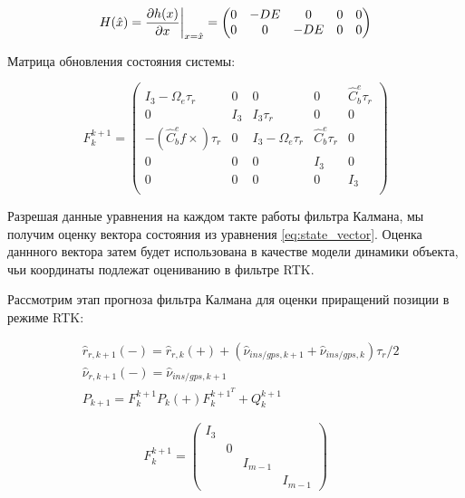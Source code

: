 \begin{equation}
	\label{eq:ins_20}
	H(\hat{x}) = \frac{\partial h(x)}{\partial x}\bigg{|}_{x=\hat{x}} = 
	\begin{pmatrix}
		0 & -DE & 0 & 0 & 0 \\ 
		0 & 0 & -DE & 0 & 0
	\end{pmatrix}
\end{equation}

Матрица обновления состояния системы: 

	\begin{equation}
		\label{eq:ins_21}
		F_k^{k+1} = 
		\begin{pmatrix}
			I_3 - \Omega_e \tau_r & 0 & 0 & 0 & \hat{C}_b^e \tau_r\\
			0 & I_3 & I_3 \tau_r & 0 & 0 \\
			-(\hat{C}_b^e f \times) \tau_r & 0 & I_3 - \Omega_e \tau_r & \hat{C}_b^e \tau_r & 0\\
			0 & 0 & 0 & I_3 & 0 \\
			0 & 0 & 0 & 0 & I_3 \\
		\end{pmatrix}
	\end{equation}

Разрешая данные уравнения на каждом такте работы фильтра Калмана, мы получим оценку вектора состояния из уравнения \ref{eq:state_vector}. Оценка даннного вектора затем будет использована в качестве модели динамики объекта, чьи координаты подлежат оцениванию в фильтре RTK. 


Рассмотрим этап прогноза фильтра Калмана для оценки приращений позиции в режиме RTK:  

\begin{equation}
	\label{eq:rk_gnss}
	\begin{split}
		& { \hat{r}_{r,k+1}(-) = \hat{r}_{r,k}(+) + (\hat{\nu}_{ins/gps,k+1} + \hat{\nu}_{ins/gps,k})\tau_r/2 } \\
		& { \hat{\nu}_{r,k+1}(-) = \hat{\nu}_{ins/gps,k+1} }\\
		& {P}_{k+1} = {F}_k^{k+1} {P}_k(+) {F}_k^{k+1^T} + {Q}_k^{k+1}
	\end{split}
\end{equation}

\begin{equation*}
	\label{eq:Fk_gnss}
	{F}_k^{k+1} = 
	\begin{pmatrix}
		{I}_3 & & & \\
		& 0 & & \\
		& & {I}_{m-1} & \\
		& & & {I}_{m-1}
	\end{pmatrix}
\end{equation*}

